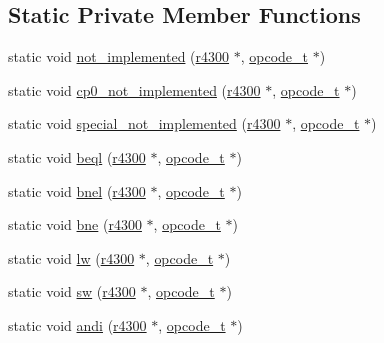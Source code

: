 \subsection*{Static Private Member Functions}
\begin{DoxyCompactItemize}
\item 
static void \hyperlink{classtms_1_1n64_1_1r4300_a5637ec65dead3d51dee7f12d64b956db}{not\+\_\+implemented} (\hyperlink{classtms_1_1n64_1_1r4300}{r4300} $\ast$, \hyperlink{classtms_1_1n64_1_1opcode__t}{opcode\+\_\+t} $\ast$)
\item 
static void \hyperlink{classtms_1_1n64_1_1r4300_ab3ede218c63b9a1c60ff82217a500b8e}{cp0\+\_\+not\+\_\+implemented} (\hyperlink{classtms_1_1n64_1_1r4300}{r4300} $\ast$, \hyperlink{classtms_1_1n64_1_1opcode__t}{opcode\+\_\+t} $\ast$)
\item 
static void \hyperlink{classtms_1_1n64_1_1r4300_a4e5f2d030d7084f739e832cba2a1bf07}{special\+\_\+not\+\_\+implemented} (\hyperlink{classtms_1_1n64_1_1r4300}{r4300} $\ast$, \hyperlink{classtms_1_1n64_1_1opcode__t}{opcode\+\_\+t} $\ast$)
\item 
static void \hyperlink{classtms_1_1n64_1_1r4300_acd95d337c018c595da5cdd3807877947}{beql} (\hyperlink{classtms_1_1n64_1_1r4300}{r4300} $\ast$, \hyperlink{classtms_1_1n64_1_1opcode__t}{opcode\+\_\+t} $\ast$)
\item 
static void \hyperlink{classtms_1_1n64_1_1r4300_a16d00db0478d05ae09964446de65fa22}{bnel} (\hyperlink{classtms_1_1n64_1_1r4300}{r4300} $\ast$, \hyperlink{classtms_1_1n64_1_1opcode__t}{opcode\+\_\+t} $\ast$)
\item 
static void \hyperlink{classtms_1_1n64_1_1r4300_a7d8a090db23193966f9fa0f6fa5a5756}{bne} (\hyperlink{classtms_1_1n64_1_1r4300}{r4300} $\ast$, \hyperlink{classtms_1_1n64_1_1opcode__t}{opcode\+\_\+t} $\ast$)
\item 
static void \hyperlink{classtms_1_1n64_1_1r4300_ae39fc447e3405aa3d4c0ab8a371dd192}{lw} (\hyperlink{classtms_1_1n64_1_1r4300}{r4300} $\ast$, \hyperlink{classtms_1_1n64_1_1opcode__t}{opcode\+\_\+t} $\ast$)
\item 
static void \hyperlink{classtms_1_1n64_1_1r4300_afe9ab97e8873f4ea7241a6e037e713c4}{sw} (\hyperlink{classtms_1_1n64_1_1r4300}{r4300} $\ast$, \hyperlink{classtms_1_1n64_1_1opcode__t}{opcode\+\_\+t} $\ast$)
\item 
static void \hyperlink{classtms_1_1n64_1_1r4300_a3e0d4f4eb35534060bf83f0d455fae35}{andi} (\hyperlink{classtms_1_1n64_1_1r4300}{r4300} $\ast$, \hyperlink{classtms_1_1n64_1_1opcode__t}{opcode\+\_\+t} $\ast$)

\end{DoxyCompactItemize}
